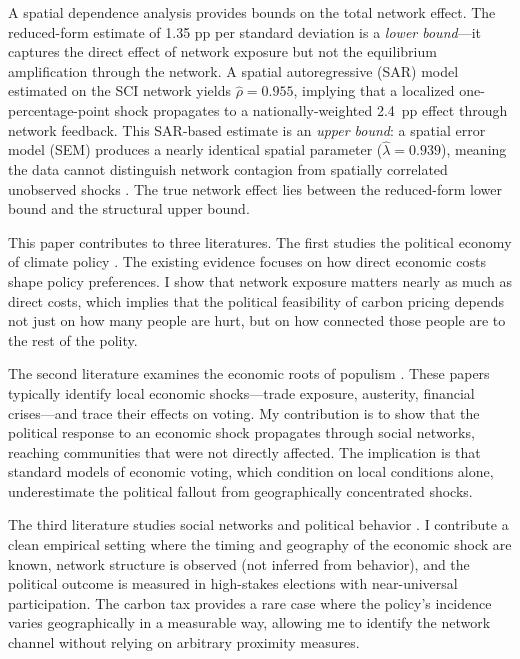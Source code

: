 \documentclass[12pt]{article}
\begin{document}
A spatial dependence analysis provides bounds on the total network effect. The reduced-form estimate of 1.35 pp per standard deviation is a \emph{lower bound}---it captures the direct effect of network exposure but not the equilibrium amplification through the network. A spatial autoregressive (SAR) model estimated on the SCI network yields $\hat{\rho} = 0.955$, implying that a localized one-percentage-point shock propagates to a nationally-weighted 2.4~pp effect through network feedback. This SAR-based estimate is an \emph{upper bound}: a spatial error model (SEM) produces a nearly identical spatial parameter ($\hat{\lambda} = 0.939$), meaning the data cannot distinguish network contagion from spatially correlated unobserved shocks \citep{lesage2009introduction}. The true network effect lies between the reduced-form lower bound and the structural upper bound.

This paper contributes to three literatures. The first studies the political economy of climate policy \citep{douenne2022yellow, klenert2018carbon, stantcheva2022understanding}. The existing evidence focuses on how direct economic costs shape policy preferences. I show that network exposure matters nearly as much as direct costs, which implies that the political feasibility of carbon pricing depends not just on how many people are hurt, but on how connected those people are to the rest of the polity.

The second literature examines the economic roots of populism \citep{autor2013china, colantone2018trade, fetzer2019did, rodrik2021populism, funke2016going, guiso2019global}. These papers typically identify local economic shocks---trade exposure, austerity, financial crises---and trace their effects on voting. My contribution is to show that the political response to an economic shock propagates through social networks, reaching communities that were not directly affected. The implication is that standard models of economic voting, which condition on local conditions alone, underestimate the political fallout from geographically concentrated shocks.

The third literature studies social networks and political behavior \citep{fluckiger2025bro, enikolopov2020social, halberstam2016homophily, bailey2018social, chetty2022social1}. I contribute a clean empirical setting where the timing and geography of the economic shock are known, network structure is observed (not inferred from behavior), and the political outcome is measured in high-stakes elections with near-universal participation. The carbon tax provides a rare case where the policy's incidence varies geographically in a measurable way, allowing me to identify the network channel without relying on arbitrary proximity measures.
\end{document}
